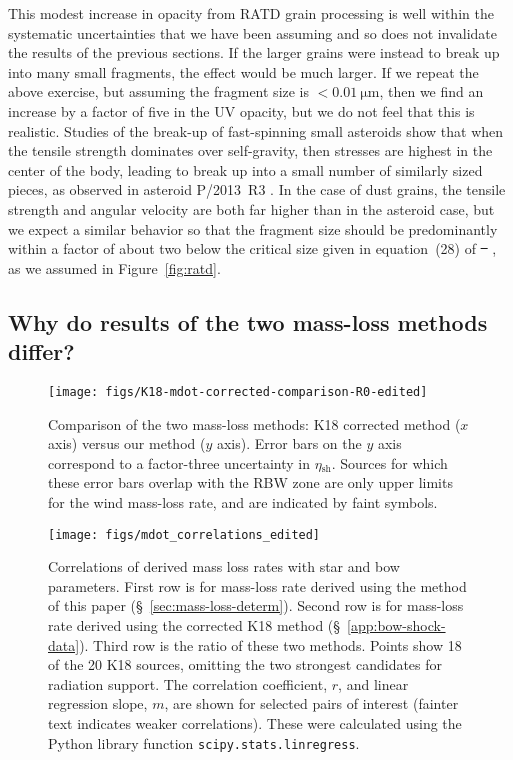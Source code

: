 \documentclass[useAMS, usenatbib, a4paper]{mnras}
\newcommand\shell{\ensuremath{_{\text{sh}}}}
\providecommand{\DIFaddtex}[1]{{\protect\color{red!70!black}\uwave{#1}}} %
\providecommand{\DIFdeltex}[1]{{\protect\color{white!50!black} \ifmmode\cancel{#1}\else\sout{#1}\fi}} %
\providecommand{\DIFaddbegin}{} %
\providecommand{\DIFaddend}{} %
\providecommand{\DIFdelbegin}{} %
\providecommand{\DIFdelend}{} %
\providecommand{\DIFadd}[1]{\texorpdfstring{\DIFaddtex{#1}}{#1}} %
\providecommand{\DIFdel}[1]{\texorpdfstring{\DIFdeltex{#1}}{}} %
\begin{document}
This modest increase in opacity from RATD grain processing is well
within the systematic uncertainties that we have been assuming and so
does not invalidate the results of the previous sections.  If the
larger grains were instead to break up into many small fragments, the
effect would be much larger.  If we repeat the above exercise, but
assuming the fragment size is \(< \SI{0.01}{\um}\), then we find an
increase by a factor of five in the UV opacity, but we do not feel
that this is realistic. Studies of the break-up of fast-spinning small
asteroids \citep{Hirabayashi:2015a, Zhang:2018a} show that when the
tensile strength dominates over self-gravity, then stresses are
highest in the center of the body, leading to break up into a small
number of similarly sized pieces, as observed in asteroid P/2013~R3
\citep{Jewitt:2014a}.  In the case of dust grains, the tensile
strength and angular velocity are both far higher than in the asteroid
case, but we expect a similar behavior so that the fragment size
should be predominantly within a factor of about two below the
critical size given in equation~(28) of \DIFdelbegin \DIFdel{\mbox{%
\citet{Hoang:2018a}}%
}\DIFdelend \DIFaddbegin \DIFadd{\mbox{%
\citet{Hoang:2019b}}%
}\DIFaddend , as we
assumed in Figure~\ref{fig:ratd}.


\subsection{Why do results of the two mass-loss methods differ?}
\label{sec:underst-diff-betw}

\begin{figure}
  \centering
  \texttt{[image: figs/K18-mdot-corrected-comparison-R0-edited]}
  \caption{Comparison of the two mass-loss methods: K18 corrected
    method (\(x\) axis) versus our method (\(y\) axis).  Error bars on
    the \(y\) axis correspond to a factor-three uncertainty in
    \(\eta\shell\).  Sources for which these error bars overlap with
    the RBW zone are only upper limits for the wind mass-loss rate,
    and are indicated by faint symbols.}
  \label{fig:mass-loss-comparison}
\end{figure}

\begin{figure*}
  \centering
  \texttt{[image: figs/mdot\_correlations\_edited]}
  \caption{Correlations of derived mass loss rates with star and bow
    parameters. First row is for mass-loss rate derived using the
    method of this paper (\S~\ref{sec:mass-loss-determ}).  Second row
    is for mass-loss rate derived using the corrected K18 method
    (\S~\ref{app:bow-shock-data}).  Third row is the ratio of these
    two methods.  Points show 18 of the 20 K18 sources, omitting the
    two strongest candidates for radiation support.  The correlation
    coefficient, \(r\), and linear regression slope, \(m\), are shown
    for selected pairs of interest (fainter text indicates weaker
    correlations).  These were calculated using the Python library
    function \texttt{scipy.stats.linregress}.}
  \label{fig:correlations}
\end{figure*}
\end{document}
